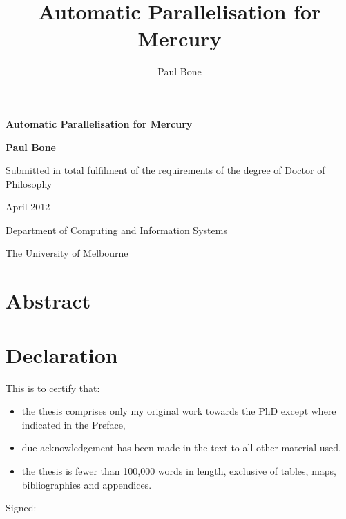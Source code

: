 \documentclass[a4paper,twoside]{report}
\title{Automatic Parallelisation for Mercury}
\author{Paul Bone}
\begin{document}
\begin{titlepage}
\begin{center}
\vspace*{3cm}
{\Huge \textbf{Automatic Parallelisation for Mercury}} \par
\vspace*{2cm}
{\huge \textbf{Paul Bone}} \par
\vspace*{4cm}
{\Large Submitted in total fulfilment of the requirements of the degree of
        Doctor of Philosophy} \par
\vspace*{1cm}
{\Large April 2012} \par
\vspace*{1cm}
{\Large Department of Computing and Information Systems} \par
{\Large The University of Melbourne} \par
\end{center}
\end{titlepage}

\chapter*{Abstract}


\chapter*{Declaration}


This is to certify that:

\begin{itemize}

    \item the thesis comprises only my original work towards the PhD except
          where indicated in the Preface,

    \item due acknowledgement has been made in the text to all other material
          used,

    \item the thesis is fewer than 100,000 words in length, exclusive of
          tables, maps, bibliographies and appendices.

\end{itemize}

\noindent Signed:
\end{document}
